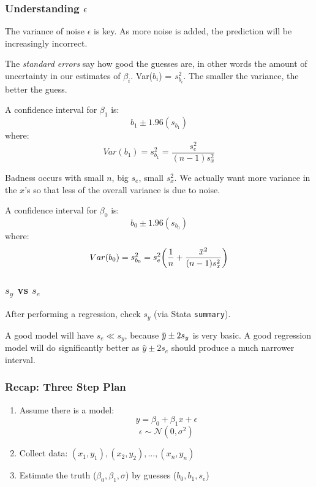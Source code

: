 \documentclass[11pt, oneside]{article}   	%
\newcommand{\overbar}[1]{\mkern 1.5mu\overline{\mkern-1.5mu#1\mkern-1.5mu}\mkern 1.5mu}
\begin{document}
\subsubsection{Understanding $\epsilon$}

The variance of noise $\epsilon$ is key. As more noise is added, the prediction will be increasingly incorrect. 

The \textit{standard errors} say how good the guesses are, in other words the amount of uncertainty in our estimates of $\beta_i$. Var($b_i$) = $s^2_{b_i}$. The smaller the variance, the better the guess.

A confidence interval for $\beta_1$ is:
\[
b_1 \pm 1.96 (s_{b_1})
\]
where:
\[
Var(b_1) = s^2_{b_1} = \frac{s^2_e} {(n-1) s_x^2}
\]

Badness occurs with small $n$, big $s_e$, small $s^2_x$. We actually want more variance in the $x$'s so that less of the overall variance is due to noise. 


A confidence interval for $\beta_0$ is:
\[
b_0 \pm 1.96 (s_{b_0})
\]
where:
\[
Var(b_0) = s^2_{b_0} = s^2_e \bigg( \frac{1}{n} + \frac{\overbar{x}^2} {(n-1) s_x^2} \bigg)
\]

\subsubsection{$s_y$ vs $s_e$}

After performing a regression, check $s_y$ (via Stata \texttt{summary}). 

A good model will have $s_e \ll s_y$, because $\overbar{y} \pm 2 s_y$ is very basic. A good regression model will do significantly better as $\hat{y} \pm 2 s_e$ should produce a much narrower interval.

\subsubsection{Recap: Three Step Plan}

\begin{enumerate}
\item{Assume there is a model: 
\[
y = \beta_0 + \beta_1 x + \epsilon
\]
\[
\epsilon \sim \mathcal{N}(0,\sigma^2)
\]}
\item{Collect data: $(x_1, y_1), (x_2, y_2), ... , (x_n, y_n)$}
\item{Estimate the truth ($\beta_0, \beta_1, \sigma$) by guesses ($b_0, b_1, s_e$)} 
\end{enumerate}
\end{document}
